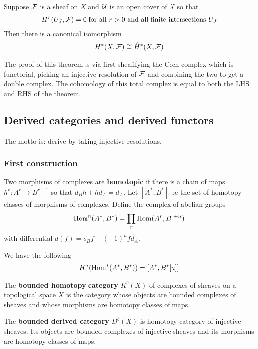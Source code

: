 \documentclass[12pt]{article}
\begin{document}
\begin{theorem}
    Suppose ${\mathcal{F}}$ is a sheaf on $X$ and ${\mathcal{U}}$ is an open cover of $X$ so that \begin{align*}
        H^r(U_J,{\mathcal{F}}) = 0 \text{ for all $r>0$ and all finite intersections $U_J$}
    \end{align*} Then there is a canonical isomorphism
    \begin{align*}
        H^*(X,{\mathcal{F}}) \cong \hat H^*(X,{\mathcal{F}})
    \end{align*}
\end{theorem}

The proof of this theorem is via first sheafifying the Cech complex which is functorial, picking an injective resolution of ${\mathcal{F}}$ and combining the two to get a double complex. The cohomology of this total complex is equal to both the LHS and RHS of the theorem.

\subsection{Derived categories and derived functors}
The motto is: derive by taking injective resolutions.
\subsubsection{First construction}
\begin{definition}
    Two morphisms of complexes are \textbf{homotopic} if there is a chain of maps
    $h^r:A^r\to B^{r-1}$ so that $d_Bh + hd_A = d_A$. Let $[A^*,B^*]$ be the set of homotopy classes
    of morphisms of complexes.
    Define the complex of abelian groups \begin{align}
        \operatorname{Hom}^n(A^*,B^*) = \prod_r \operatorname{Hom}(A^r,B^{r+n})
    \end{align} with differential $d(f) = d_Bf - (-1)^nf d_A$.
\end{definition}
We have the following \begin{align*}
    H^n(\operatorname{Hom}^*(A^*,B^*)) = [A^*,B^*[n]]
\end{align*}

\begin{definition}

    The \textbf{bounded homotopy category }$K^b(X)$ of complexes of sheaves on a topological space $X$
    is the category whose objects are bounded complexes of sheaves
    and whose morphisms are homotopy classes of maps.



    The \textbf{bounded derived category} $D^b(X)$ is homotopy category of injective sheaves. Its objects
    are bounded complexes of injective sheaves and its morphisms are homotopy classes of maps.
\end{definition}
\end{document}
